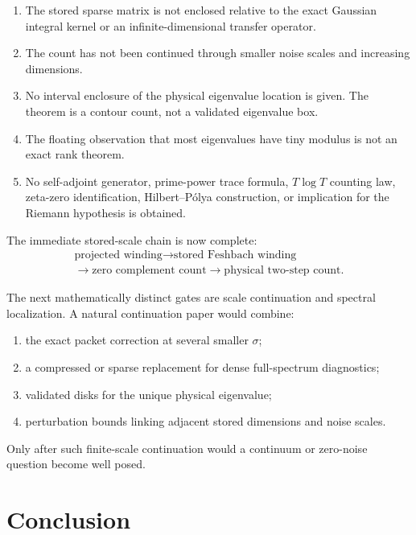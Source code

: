\documentclass[11pt]{article}
\theoremstyle{definition}
\theoremstyle{remark}
\begin{document}
\begin{enumerate}
 \item The stored sparse matrix is not enclosed relative to the exact
       Gaussian integral kernel or an infinite-dimensional transfer
       operator.
 \item The count has not been continued through smaller noise scales and
       increasing dimensions.
 \item No interval enclosure of the physical eigenvalue location is given.
       The theorem is a contour count, not a validated eigenvalue box.
 \item The floating observation that most eigenvalues have tiny modulus is
       not an exact rank theorem.
 \item No self-adjoint generator, prime-power trace formula,
       \(T\log T\) counting law, zeta-zero identification,
       Hilbert--P\'olya construction, or implication for the Riemann
       hypothesis is obtained.
\end{enumerate}

The immediate stored-scale chain is now complete:
\[
\begin{gathered}
\text{projected winding}
\longrightarrow
\text{stored Feshbach winding}\\
\longrightarrow
\text{zero complement count}
\longrightarrow
\text{physical two-step count}.
\end{gathered}
\]

The next mathematically distinct gates are scale continuation and spectral
localization.  A natural continuation paper would combine:

\begin{enumerate}
 \item the exact packet correction at several smaller \(\sigma\);
 \item a compressed or sparse replacement for dense full-spectrum
       diagnostics;
 \item validated disks for the unique physical eigenvalue;
 \item perturbation bounds linking adjacent stored dimensions and noise
       scales.
\end{enumerate}

Only after such finite-scale continuation would a continuum or zero-noise
question become well posed.

\section{Conclusion}
\label{sec:conclusion}
\end{document}

